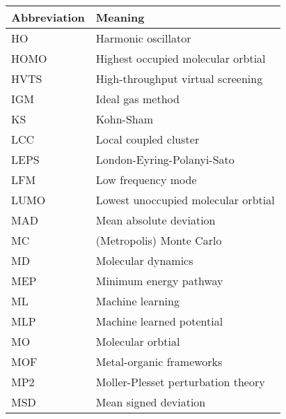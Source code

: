 \documentclass[../main.tex]{subfiles}
\begin{document}
\begin{table}[h!]
\def\arraystretch{2.0}
\begin{tabularx}{\textwidth}{YY}
Abbreviation & Meaning \\
\hline
HO	&	Harmonic oscillator	\\
HOMO	&	Highest occupied molecular orbtial	\\
HVTS	&	High-throughput virtual screening	\\
IGM	&	Ideal gas method	\\
KS	&	Kohn-Sham	\\
LCC	&	Local coupled cluster	\\
LEPS	&	London-Eyring-Polanyi-Sato	\\
LFM	&	Low frequency mode	\\
LUMO	&	Lowest unoccupied molecular orbtial	\\
MAD	&	Mean absolute deviation	\\
MC	&	(Metropolis) Monte Carlo	\\
MD	&	Molecular dynamics	\\
MEP	&	Minimum energy pathway	\\
ML	&	Machine learning	\\
MLP	&	Machine learned potential	\\
MO	&	Molecular orbtial	\\
MOF	&	Metal-organic frameworks	\\
MP2	&	Moller-Plesset perturbation theory	\\
MSD	&	Mean signed deviation	\\
\end{tabularx}
\end{table}
\newpage
\end{document}
